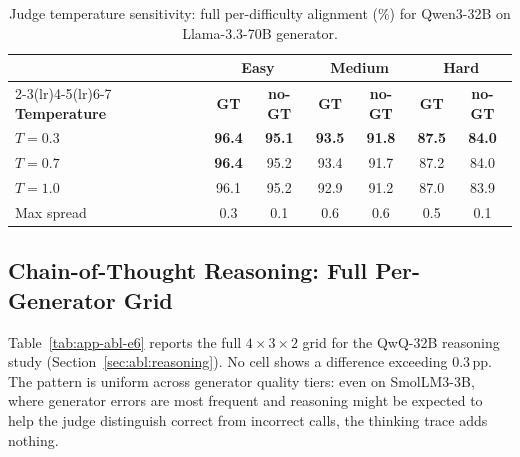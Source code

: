 \begin{table}[!htbp]
\centering
\small
\setlength{\tabcolsep}{4.5pt}
\renewcommand{\arraystretch}{1.05}
\caption{Judge temperature sensitivity: full per-difficulty alignment (\%) for Qwen3-32B on Llama-3.3-70B generator.}
\label{tab:app-abl-temp}
\begin{tabular}{@{}lcccccc@{}}
\toprule
 & \multicolumn{2}{c}{\textbf{Easy}} & \multicolumn{2}{c}{\textbf{Medium}} & \multicolumn{2}{c}{\textbf{Hard}} \\
\cmidrule(lr){2-3}\cmidrule(lr){4-5}\cmidrule(lr){6-7}
\textbf{Temperature} & \textbf{GT} & \textbf{no-GT} & \textbf{GT} & \textbf{no-GT} & \textbf{GT} & \textbf{no-GT} \\
\midrule
$T = 0.3$ & \textbf{96.4} & \textbf{95.1} & \textbf{93.5} & \textbf{91.8} & \textbf{87.5} & \textbf{84.0} \\
$T = 0.7$ & \textbf{96.4} & 95.2          & 93.4          & 91.7          & 87.2          & 84.0          \\
$T = 1.0$ & 96.1          & 95.2          & 92.9          & 91.2          & 87.0          & 83.9          \\
\midrule
Max spread & 0.3 & 0.1 & 0.6 & 0.6 & 0.5 & 0.1 \\
\bottomrule
\end{tabular}
\end{table}

\subsection*{Chain-of-Thought Reasoning: Full Per-Generator Grid}

Table~\ref{tab:app-abl-e6} reports the full $4 \times 3 \times 2$ grid for the QwQ-32B reasoning study (Section~\ref{sec:abl:reasoning}). No cell shows a difference exceeding $0.3$\,pp. The pattern is uniform across generator quality tiers: even on SmolLM3-3B, where generator errors are most frequent and reasoning might be expected to help the judge distinguish correct from incorrect calls, the thinking trace adds nothing.

